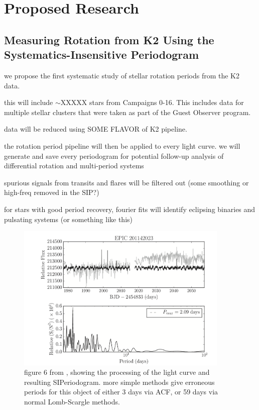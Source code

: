 \documentclass[12pt]{article}
\begin{document}
\section{Proposed Research}
\subsection{Measuring Rotation from K2 Using the Systematics-Insensitive Periodogram }
we propose the first systematic study of stellar rotation periods from the K2 data.

this will include $\sim$XXXXX stars from Campaigns 0-16. This includes data for multiple stellar clusters that were taken as part of the Guest Observer program.

data will be reduced using SOME FLAVOR of K2 pipeline.


the \citet{angus2016} rotation period pipeline will then be applied to every light curve. we will generate and save every periodogram for potential follow-up analysis of differential rotation and multi-period systems

spurious signals from transits and flares will be filtered out (some smoothing or high-freq removed in the SIP?)

for stars with good period recovery, fourier fits will identify eclipsing binaries and pulsating systems (or something like this)


\begin{figure}[!th]
\centering
\includegraphics[width=4in]{angus2016_fig6.png}
\caption{
figure 6 from \citet{angus2016}, showing the processing of the light curve and resulting SIPeriodogram. more simple methods give erroneous periods for this object of either 3 days via ACF, or 59 days via normal Lomb-Scargle methods.
}
\label{fig:sip}
\end{figure}
\end{document}
